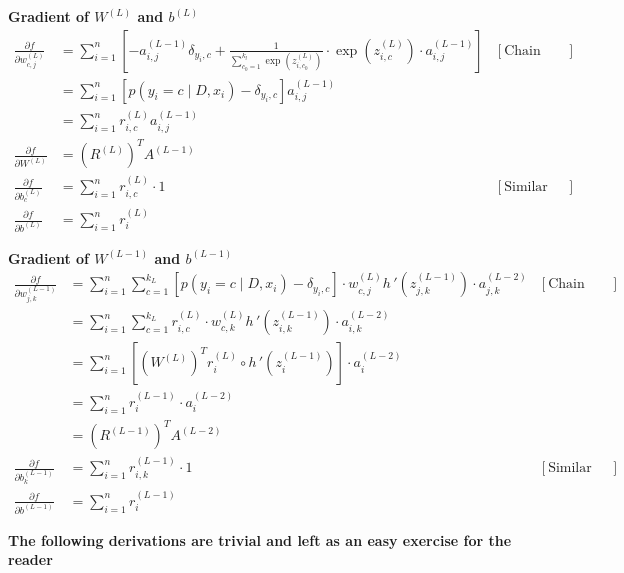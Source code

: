 \documentclass{article}
\begin{document}
\vspace{1cm}

\textbf{Gradient of $W^{(L)}$ and $b^{(L)}$}
\begin{align*}
    \frac{\partial f}{\partial w_{c,j}^{(L)}} &= \sum_{i=1}^{n} \left[-a_{i,j}^{(L-1)}\delta_{y_i, c} + \frac{1}{\sum_{c_0=1}^{k_l} \exp\left(z_{i,c_0}^{(L)}\right)}  \cdot \exp\left(z_{i,c}^{(L)}\right) \cdot a_{i,j}^{(L-1)}\right] &[\text{Chain Rule}] \\
    &= \sum_{i=1}^{n} [p(y_i = c \mid D, x_i) - \delta_{y_i,c}]a_{i,j}^{(L-1)} \\
    &= \sum_{i=1}^{n} r_{i,c}^{(L)}a_{i,j}^{(L-1)} \\
    \frac{\partial f}{\partial W^{(L)}} &= \left(R^{(L)}\right)^TA^{(L-1)} \\
    \frac{\partial f}{\partial b_{c}^{(L)}} &= \sum_{i=1}^{n} r_{i, c}^{(L)} \cdot 1 &[\text{Similar work as above}] \\
    \frac{\partial f}{\partial b^{(L)}} &= \sum_{i=1}^{n} r_i^{(L)} 
\end{align*}

\newpage

\textbf{Gradient of $W^{(L-1)}$ and $b^{(L-1)}$}
\begin{align*}
    \frac{\partial f}{\partial w_{j, k}^{(L-1)}} &= \sum_{i=1}^{n} \sum_{c=1}^{k_L} \left[p(y_i = c \mid D, x_i) - \delta_{y_i, c}\right] \cdot w_{c,j}^{(L)}  h\,'\left(z_{j, k}^{(L-1)}\right) \cdot a_{j, k}^{(L-2)} &[\text{Chain Rule}]\\
    &= \sum_{i=1}^{n} \sum_{c=1}^{k_L} r_{i,c}^{(L)} \cdot w_{c,k}^{(L)}h\,'\left(z_{i, k}^{(L-1)}\right) \cdot a_{i, k}^{(L-2)} \\
    &= \sum_{i=1}^{n} \left[\left(W^{(L)}\right)^T r_i^{(L)} \circ h\,'\left(z_{i}^{(L-1)}\right)\right] \cdot a_i^{(L-2)} \\
    &= \sum_{i=1}^{n} r_{i}^{(L-1)} \cdot a_i^{(L-2)} \\
    &= \left(R^{(L-1)}\right)^T A^{(L-2)} \\
    \frac{\partial f}{\partial b_{k}^{(L-1)}} &= \sum_{i=1}^{n} r_{i, k}^{(L-1)} \cdot 1 &[\text{Similar work as above}] \\
    \frac{\partial f}{\partial b^{(L-1)}} &= \sum_{i=1}^{n} r_i^{(L-1)} 
\end{align*}

\vspace{1cm}

\textbf{The following derivations are trivial and left as an easy exercise for the reader}
\end{document}
